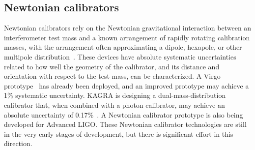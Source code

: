 \subsection{Newtonian calibrators}
Newtonian calibrators rely on the Newtonian gravitational interaction between an interferometer test mass and a known arrangement of rapidly rotating calibration masses, with the arrangement often approximating a dipole, hexapole, or other multipole distribution~\cite{Matone:2007vk,Inoue:2018okt}.
These devices have absolute systematic uncertainties related to how well the geometry of the calibrator, and its distance and orientation with respect to the test mass, can be characterized.
A Virgo prototype~\cite{0264-9381-35-23-235009} has already been deployed, and an improved prototype may achieve a 1\% systematic uncertainty.
KAGRA is designing a dual-mass-distribution calibrator that, when combined with a photon calibrator, may achieve an absolute uncertainty of 0.17\%~\cite{PhysRevD.98.022005}.
A Newtonian calibrator prototype is also being developed for Advanced LIGO.
These Newtonian calibrator technologies are still in the very early stages of development, but there is significant effort in this direction.


